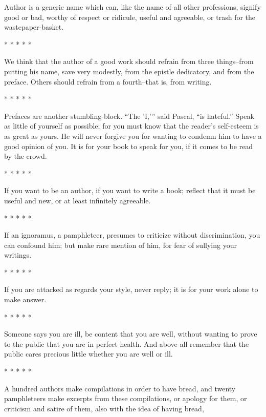 Author is a generic name which can, like the name of all other
professions, signify good or bad, worthy of respect or ridicule, useful
and agreeable, or trash for the wastepaper-basket.
\begin{center}
       *       *       *       *       *
\end{center}
We think that the author of a good work should refrain from three
things--from putting his name, save very modestly, from the epistle
dedicatory, and from the preface. Others should refrain from a
fourth--that is, from writing.
\begin{center}
       *       *       *       *       *
\end{center}
Prefaces are another stumbling-block. \enquote{The 'I,'} said Pascal, \enquote{is
hateful.} Speak as little of yourself as possible; for you must know
that the reader's self-esteem is as great as yours. He will never
forgive you for wanting to condemn him to have a good opinion of you. It
is for your book to speak for you, if it comes to be read by the crowd.
\begin{center}
       *       *       *       *       *
\end{center}
If you want to be an author, if you want to write a book; reflect that
it must be useful and new, or at least infinitely agreeable.
\begin{center}
       *       *       *       *       *
\end{center}
If an ignoramus, a pamphleteer, presumes to criticize without
discrimination, you can confound him; but make rare mention of him, for
fear of sullying your writings.
\begin{center}
       *       *       *       *       *
\end{center}
If you are attacked as regards your style, never reply; it is for your
work alone to make answer.
\begin{center}
       *       *       *       *       *
\end{center}
Someone says you are ill, be content that you are well, without wanting
to prove to the public that you are in perfect health. And above all
remember that the public cares precious little whether you are well or
ill.
\begin{center}
       *       *       *       *       *
\end{center}
A hundred authors make compilations in order to have bread, and twenty
pamphleteers make excerpts from these compilations, or apology for them,
or criticism and satire of them, also with the idea of having bread,
